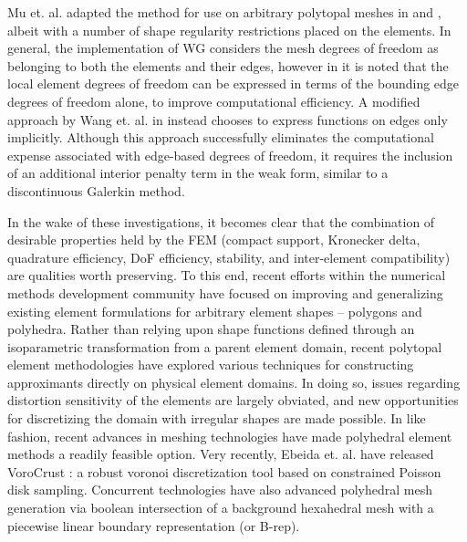 	Mu et. al. adapted the method for use on arbitrary polytopal meshes in \cite{Mu:15:2} and \cite{Mu:15:1}, albeit with a number of shape regularity restrictions placed on the elements. In general, the implementation of WG considers the mesh degrees of freedom as belonging to both the elements and their edges, however in \cite{Mu:15:1} it is noted that the local element degrees of freedom can be expressed in terms of the bounding edge degrees of freedom alone, to improve computational efficiency. A modified approach by Wang et. al. in \cite{Wang:14} instead chooses to express functions on edges only implicitly. Although this approach successfully eliminates the computational expense associated with edge-based degrees of freedom, it requires the inclusion of an additional interior penalty term in the weak form, similar to a discontinuous Galerkin method.

	In the wake of these investigations, it becomes clear that the combination of desirable properties held by the FEM (compact support, Kronecker delta, quadrature efficiency, DoF efficiency, stability, and inter-element compatibility) are qualities worth preserving. To this end, recent efforts within the numerical methods development community have focused on improving and generalizing existing element formulations for arbitrary element shapes -- polygons and polyhedra. Rather than relying upon shape functions defined through an isoparametric transformation from a parent element domain, recent polytopal element methodologies have explored various techniques for constructing approximants directly on physical element domains. In doing so, issues regarding distortion sensitivity of the elements are largely obviated, and new opportunities for discretizing the domain with irregular shapes are made possible.
	In like fashion, recent advances in meshing technologies have made polyhedral element methods a readily feasible option. Very recently, Ebeida et. al. have released VoroCrust \cite{Ebeida:17}: a robust voronoi discretization tool based on constrained Poisson disk sampling. Concurrent technologies have also advanced polyhedral mesh generation via boolean intersection of a background hexahedral mesh with a piecewise linear boundary representation (or B-rep).

